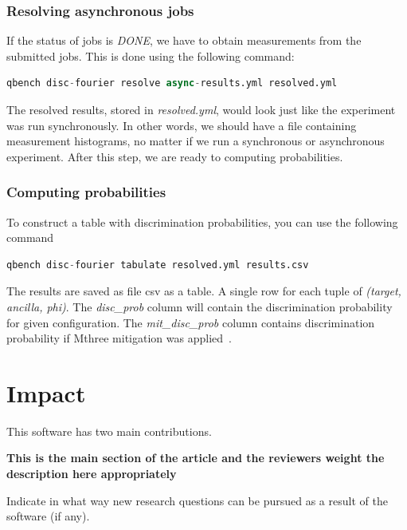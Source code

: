 \documentclass[preprint,12pt, a4paper, dvipsnames]{elsarticle}
\newcommand{\1}{{\rm 1\hspace{-0.9mm}l}}
\begin{document}
\subsubsection{Resolving asynchronous jobs}
If the status of jobs is \textit{DONE}, we have to obtain measurements from the submitted jobs. This is done using the following command:
\begin{lstlisting}[language=Python]
qbench disc-fourier resolve async-results.yml resolved.yml
\end{lstlisting}
The resolved results, stored in \textit{resolved.yml}, would look just like the experiment was run synchronously. In other words, we should have a file containing measurement histograms, no matter if we run a synchronous or asynchronous experiment. After this step, we are ready to computing probabilities.


\subsubsection{Computing probabilities}
To construct a table with discrimination probabilities, you can use the following command
\begin{lstlisting}[language=Python]
qbench disc-fourier tabulate resolved.yml results.csv 
\end{lstlisting}
The results are saved as file csv as a table.
A single row for each tuple of \textit{(target, ancilla, phi)}. The \textit{disc\_prob} column will contain the discrimination probability for given configuration. The \textit{mit\_disc\_prob} column contains discrimination probability if Mthree mitigation was applied~\cite{mthree, mthreepublication}.











\section{Impact}
This software has two main contributions.



\textbf{This is the main section of the article and the reviewers weight the
description here appropriately}

Indicate in what way new research questions can be pursued as a result of the
software (if any).
\end{document}
